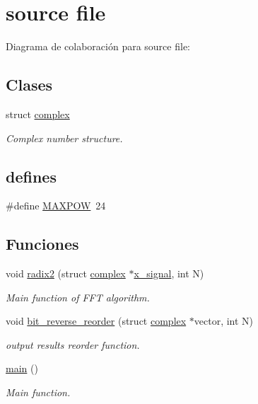 \hypertarget{group___main}{}\section{source file}
\label{group___main}
Diagrama de colaboración para source file\+:
\subsection*{Clases}
\begin{DoxyCompactItemize}
\item 
struct \hyperlink{structcomplex}{complex}
\begin{DoxyCompactList}\small\item\em Complex number structure. \end{DoxyCompactList}\end{DoxyCompactItemize}
\subsection*{\textquotesingle{}defines\textquotesingle{}}
\begin{DoxyCompactItemize}
\item 
\#define \hyperlink{group___main_gaeb7ac177f98359103932539c10abf8c8}{M\+A\+X\+P\+OW}~24
\end{DoxyCompactItemize}
\subsection*{Funciones}
\begin{DoxyCompactItemize}
\item 
void \hyperlink{group___main_ga87b37e951d1fd3e2ebe6a98c0ea50330}{radix2} (struct \hyperlink{structcomplex}{complex} $\ast$\hyperlink{group___main_ga50a386ea2d430e81f1bd2cbcb70eafcb}{x\+\_\+signal}, int N)
\begin{DoxyCompactList}\small\item\em Main function of F\+FT algorithm. \end{DoxyCompactList}\item 
void \hyperlink{group___main_gac5dcf3013b0c8382efd1ff2d3ec28dda}{bit\+\_\+reverse\+\_\+reorder} (struct \hyperlink{structcomplex}{complex} $\ast$vector, int N)
\begin{DoxyCompactList}\small\item\em output results reorder function. \end{DoxyCompactList}\item 
\hyperlink{group___main_ga51af30a60f9f02777c6396b8247e356f}{main} ()
\begin{DoxyCompactList}\small\item\em Main function. \end{DoxyCompactList}\end{DoxyCompactItemize}
